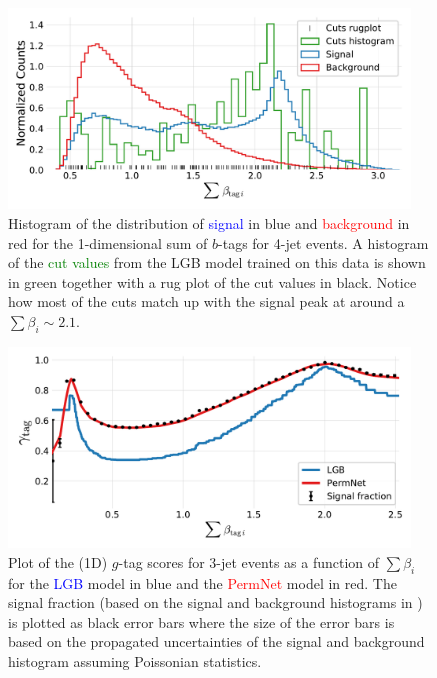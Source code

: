 \FloatBarrier
\newpage


\begin{figure}
  \includegraphics[width=0.95\textwidth, trim=10 10 10 20, clip]{figures/quarks/gtag_sum_method_njet=4-down_sample=1.00-ML_vars=vertex-selection=b-ejet_min=4-n_iter_RS_lgb=99-n_iter_RS_xgb=9-cdot_cut=0.90-version=19.pdf}
  \caption[1D LGB Model Cuts for 4-jets events]
          {Histogram of the distribution of \textcolor{blue}{signal} in blue and \textcolor{red}{background} in red for the 1-dimensional sum of $b$-tags for 4-jet events. A histogram of the \textcolor{green}{cut values} from the LGB model trained on this data is shown in green together with a rug plot of the cut values in black. Notice how most of the cuts match up with the signal peak at around a $\sum \beta_i \sim 2.1$.
          } 
  \label{fig:q:1d_sum_model_cuts_4j}
\end{figure}







\begin{figure}
  \includegraphics[width=0.95\textwidth, trim=10 10 10 10, clip]{figures/quarks/gtag_sum_models_njet=3-down_sample=1.00-ML_vars=vertex-selection=b-ejet_min=4-n_iter_RS_lgb=99-n_iter_RS_xgb=9-cdot_cut=0.90-version=19.pdf}
  \caption[1D Sum Models Predictions and Signal Fraction for 3-jets events]
          {Plot of the (1D) $g$-tag scores for 3-jet events as a function of $\sum \beta_i$ for the \textcolor{blue}{LGB} model in blue and the \textcolor{red}{PermNet} model in red. The signal fraction (based on the signal and background histograms in ) is plotted as black error bars where the size of the error bars is based on the propagated uncertainties of the signal and background histogram assuming Poissonian statistics. } 
  \label{fig:q:1d_sum_models_signal_fraction_3j}
\end{figure}


